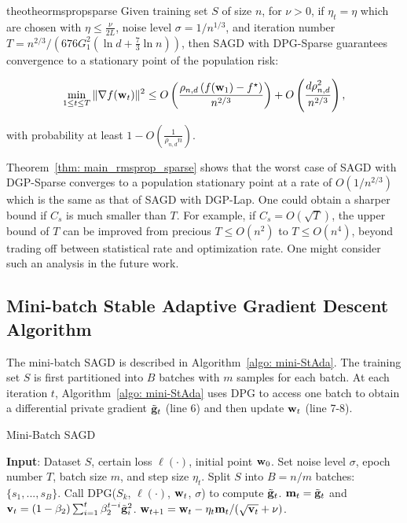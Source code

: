 \documentclass[11pt]{article}
\begin{document}
\begin{restatable}{theo}{theormspropsparse}
\label{thm: main_rmsprop_sparse}
 Given training set $S$ of size $n$, for $\nu >0$, if $\eta_t = \eta$ which are chosen with $\eta \leq \frac{\nu}{2L}$, noise level $\sigma = 1/n^{1/3}$, and iteration number $T = n^{2/3}/\left(676G_1^2(\ln d + \frac{7}{3}\ln n)\right)$, then \textsc{SAGD} with DPG-Sparse  guarantees convergence to a stationary point of the population risk:
  \begin{small}
\begin{equation*}
 \min_{1\leq t\leq T}\|\nabla f(\mathbf{w}_t)\|^2 \leq
 O \left( \frac{\rho_{n,d} \left(f(\mathbf{w}_1) - f^\star \right)}{n^{2/3}} \right) + O \left( \frac{d \rho_{n,d}^2}{n^{2/3}}\right),
\end{equation*}
\end{small}
with probability at least $1-O\left(\frac{1}{\rho_{n,d} n}\right)$.
\end{restatable} 


Theorem~\ref{thm: main_rmsprop_sparse} shows that the worst case of \textsc{SAGD} with DGP-Sparse converges to a population stationary point at a rate of $O(1/n^{2/3})$ which is the same as that of \textsc{SAGD} with DGP-Lap. One could obtain a sharper bound if $C_{s}$ is much smaller than $T$. For example, if $C_{s} = O(\sqrt{T})$, the upper bound of $T$ can be improved from precious $T \leq O(n^2)$ to $T \leq O(n^4)$, beyond trading off between statistical rate and optimization rate. One might consider such an analysis in the future work.



\subsection{Mini-batch Stable Adaptive Gradient Descent Algorithm}
\label{mini-batch algorithm}

The mini-batch \textsc{SAGD} is described in Algorithm~\ref{algo: mini-StAda}. The training set $S$ is first partitioned
into $B$ batches with $m$ samples for each batch. At each iteration $t$, Algorithm~\ref{algo: mini-StAda} uses DPG to access one batch to obtain a differential private gradient $\tilde {\mathbf{g}}_t$ (line 6) and then update $\mathbf{w}_t$ (line 7-8). 
\begin{algorithm}[H] 
\caption{Mini-Batch \textsc{SAGD}}
\begin{algorithmic}[1] \label{algo: mini-StAda}
\STATE \textbf{Input}: Dataset $S$,  certain loss $\ell(\cdot)$, initial point $\mathbf{w}_0$.
\STATE Set noise level $\sigma$, epoch number $T$,  batch size $m$, and step size $\eta_t$.
\STATE Split $S$ into $B=n/m$ batches: $\{ s_1,..., s_B\}$.
\STATE Call DPG($S_k$,  $\ell(\cdot)$, $\mathbf{w}_t$, $\sigma$) to compute $\tilde {\mathbf{g}}_t$.
\STATE $\mathbf{m}_t = \tilde {\mathbf{g}}_t$ and $\mathbf{v}_t = \left(1-\beta_{2}\right) \sum_{i=1}^{t} \beta_{2}^{t-i} \tilde {\mathbf{g}}_{i}^{2}$.
\STATE $\mathbf{w}_{t+1}=\mathbf{w}_{t}-\eta_t \mathbf{m}_t /(\sqrt{\mathbf{v}_t}+\nu)$.
\ENDFOR
\ENDFOR 
\end{algorithmic}
\end{algorithm} 
\end{document}
